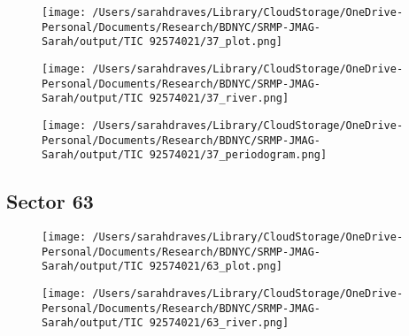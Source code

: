 \documentclass{report}%
\begin{document}
\begin{figure}[H]%
\begin{center}%
\centering%
\texttt{[image: /Users/sarahdraves/Library/CloudStorage/OneDrive-Personal/Documents/Research/BDNYC/SRMP-JMAG-Sarah/output/TIC 92574021/37\_plot.png]}%
\end{center}%
\end{figure}

%


\begin{figure}[H]%
\begin{center}%
\centering%
\texttt{[image: /Users/sarahdraves/Library/CloudStorage/OneDrive-Personal/Documents/Research/BDNYC/SRMP-JMAG-Sarah/output/TIC 92574021/37\_river.png]}%
\end{center}%
\end{figure}

%


\begin{figure}[H]%
\begin{center}%
\centering%
\texttt{[image: /Users/sarahdraves/Library/CloudStorage/OneDrive-Personal/Documents/Research/BDNYC/SRMP-JMAG-Sarah/output/TIC 92574021/37\_periodogram.png]}%
\end{center}%
\end{figure}

%
\newpage%
\subsection{Sector 63}%
\label{subsec:TIC9257402163}%


\begin{figure}[H]%
\begin{center}%
\centering%
\texttt{[image: /Users/sarahdraves/Library/CloudStorage/OneDrive-Personal/Documents/Research/BDNYC/SRMP-JMAG-Sarah/output/TIC 92574021/63\_plot.png]}%
\end{center}%
\end{figure}

%


\begin{figure}[H]%
\begin{center}%
\centering%
\texttt{[image: /Users/sarahdraves/Library/CloudStorage/OneDrive-Personal/Documents/Research/BDNYC/SRMP-JMAG-Sarah/output/TIC 92574021/63\_river.png]}%
\end{center}%
\end{figure}
\end{document}
